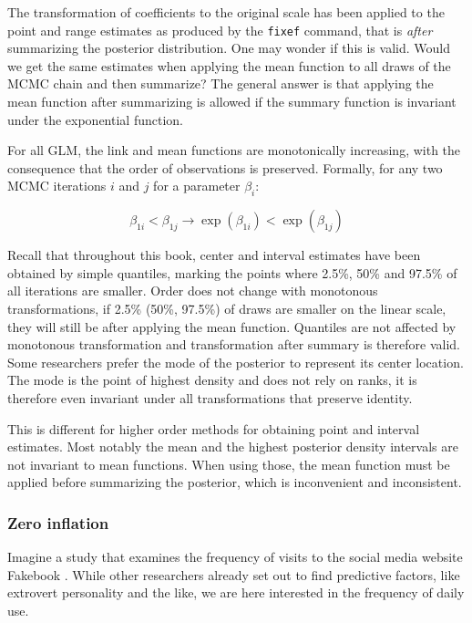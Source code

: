 \documentclass[]{svmono}
\begin{document}
The transformation of coefficients to the original scale has been
applied to the point and range estimates as produced by the
\texttt{fixef} command, that is \emph{after} summarizing the posterior
distribution. One may wonder if this is valid. Would we get the same
estimates when applying the mean function to all draws of the MCMC chain
and then summarize? The general answer is that applying the mean
function after summarizing is allowed if the summary function is
invariant under the exponential function.

For all GLM, the link and mean functions are monotonically increasing,
with the consequence that the order of observations is preserved.
Formally, for any two MCMC iterations \(i\) and \(j\) for a parameter
\(\beta_i\):

\[
\beta_{1i} < \beta_{1j} \rightarrow \exp(\beta_{1i}) < \exp(\beta_{1j})
\]

Recall that throughout this book, center and interval estimates have
been obtained by simple quantiles, marking the points where 2.5\%, 50\%
and 97.5\% of all iterations are smaller. Order does not change with
monotonous transformations, if 2.5\% (50\%, 97.5\%) of draws are smaller
on the linear scale, they will still be after applying the mean
function. Quantiles are not affected by monotonous transformation and
transformation after summary is therefore valid. Some researchers prefer
the mode of the posterior to represent its center location. The mode is
the point of highest density and does not rely on ranks, it is therefore
even invariant under all transformations that preserve identity.

This is different for higher order methods for obtaining point and
interval estimates. Most notably the mean and the highest posterior
density intervals are not invariant to mean functions. When using those,
the mean function must be applied before summarizing the posterior,
which is inconvenient and inconsistent.

\subsubsection{Zero inflation}\label{zero-inflation}

Imagine a study that examines the frequency of visits to the social
media website Fakebook . While other researchers already set out to find
predictive factors, like extrovert personality and the like, we are here
interested in the frequency of daily use.
\end{document}
